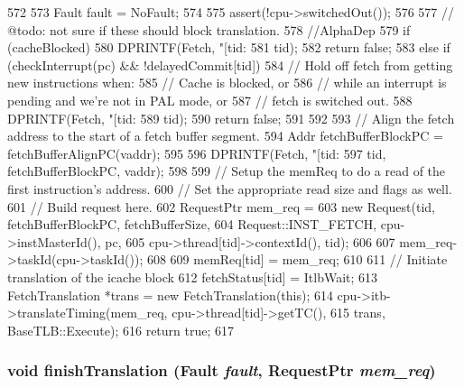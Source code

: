 \begin{DoxyCode}
572 {
573     Fault fault = NoFault;
574 
575     assert(!cpu->switchedOut());
576 
577     // @todo: not sure if these should block translation.
578     //AlphaDep
579     if (cacheBlocked) {
580         DPRINTF(Fetch, "[tid:%
581                 tid);
582         return false;
583     } else if (checkInterrupt(pc) && !delayedCommit[tid]) {
584         // Hold off fetch from getting new instructions when:
585         // Cache is blocked, or
586         // while an interrupt is pending and we're not in PAL mode, or
587         // fetch is switched out.
588         DPRINTF(Fetch, "[tid:%
589                 tid);
590         return false;
591     }
592 
593     // Align the fetch address to the start of a fetch buffer segment.
594     Addr fetchBufferBlockPC = fetchBufferAlignPC(vaddr);
595 
596     DPRINTF(Fetch, "[tid:%
597             tid, fetchBufferBlockPC, vaddr);
598 
599     // Setup the memReq to do a read of the first instruction's address.
600     // Set the appropriate read size and flags as well.
601     // Build request here.
602     RequestPtr mem_req =
603         new Request(tid, fetchBufferBlockPC, fetchBufferSize,
604                     Request::INST_FETCH, cpu->instMasterId(), pc,
605                     cpu->thread[tid]->contextId(), tid);
606 
607     mem_req->taskId(cpu->taskId());
608 
609     memReq[tid] = mem_req;
610 
611     // Initiate translation of the icache block
612     fetchStatus[tid] = ItlbWait;
613     FetchTranslation *trans = new FetchTranslation(this);
614     cpu->itb->translateTiming(mem_req, cpu->thread[tid]->getTC(),
615                               trans, BaseTLB::Execute);
616     return true;
617 }
\end{DoxyCode}
\hypertarget{classDefaultFetch_ac7dca7de206b6388e989a53b56634ad4}{
\subsubsection[{finishTranslation}]{\setlength{\rightskip}{0pt plus 5cm}void finishTranslation ({\bf Fault} {\em fault}, \/  {\bf RequestPtr} {\em mem\_\-req})}}
\label{classDefaultFetch_ac7dca7de206b6388e989a53b56634ad4}



